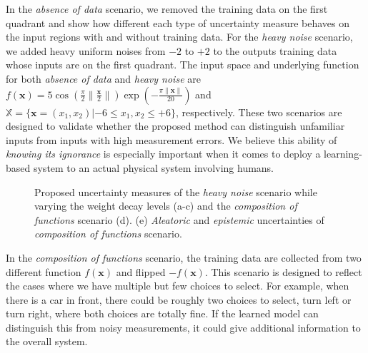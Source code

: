 \documentclass[letterpaper, 10 pt, conference]{ieeeconf}  %
\def\Bx{\mathbf{x}} \def\By{\mathbf{y}} \def\Bp{\mathbf{p}}
\begin{document}
In the \textit{absence of data} scenario, we removed the training data 
on the first quadrant and show how different 
each type of uncertainty measure behaves on the input regions 
with and without training data.
For the \textit{heavy noise} scenario, we added heavy uniform noises from $-2$ to $+2$
to the outputs training data whose inputs are on the first quadrant.
The input space and underlying function for both \textit{absence of data}
and \textit{heavy noise} are
$f(\Bx) = 5\cos(\frac{\pi}{2} \|\frac{\Bx}{2}\| )\exp(-\frac{\pi \| \Bx \| }{20})$
and $\mathbb{X}= \{ \Bx=(x_1, x_2) | -6 \le x_1, x_2 \le +6\} $, respectively. 
These two scenarios are designed to validate whether the proposed method
can distinguish unfamiliar inputs from inputs with high measurement errors.
We believe this ability of \textit{knowing its ignorance} is especially important
when it comes to deploy a learning-based system to 
an actual physical system involving humans. 


\begin{figure*}[t] \centering
	\caption{
		Proposed uncertainty measures of 
		the \textit{heavy noise} scenario
		while varying the weight decay levels (a-c) and 
		the \textit{composition of functions} scenario (d). 
		(e) \textit{Aleatoric} and \textit{epistemic} uncertainties of
		\textit{composition of functions} scenario.
	}
	\label{fig:tracktrajres}
\end{figure*}


In the \textit{composition of functions} scenario, the training data
are collected from two different function $f(\Bx)$ and flipped $-f(\Bx)$. 
This scenario is designed to reflect the cases where we have 
multiple but few choices to select. 
For example, when there is a car in front, there could be roughly 
two choices to select, turn left or turn right, where both 
choices are totally fine. 
If the learned model can distinguish this from noisy measurements,
it could give additional information to the overall system. 
\end{document}
